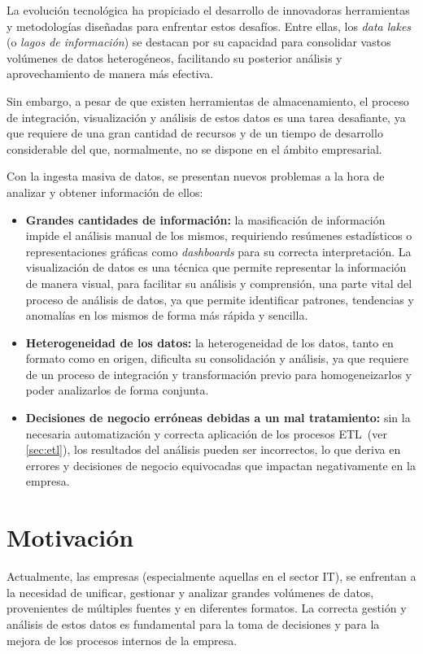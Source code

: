 La evolución tecnológica ha propiciado el desarrollo de innovadoras herramientas
y metodologías diseñadas para enfrentar estos desafíos. Entre ellas, los
\textit{data lakes} (o \emph{lagos de información}) se destacan por su capacidad
para consolidar vastos volúmenes de datos heterogéneos, facilitando su posterior
análisis y aprovechamiento de manera más efectiva.

Sin embargo, a pesar de que existen herramientas de almacenamiento, el proceso
de integración, visualización y análisis de estos datos es una tarea desafiante,
ya que requiere de una gran cantidad de recursos y de un tiempo de desarrollo
considerable del que, normalmente, no se dispone en el ámbito empresarial.

Con la ingesta masiva de datos, se presentan nuevos problemas a la hora de
analizar y obtener información de ellos:

\begin{itemize}
	\item \textbf{Grandes cantidades de información:}
		la masificación de información impide el análisis manual de los
		mismos, requiriendo resúmenes estadísticos o representaciones gráficas
		como \textit{dashboards} para su correcta interpretación.
		La visualización de datos es una técnica que permite representar la
		información de manera visual, para facilitar su análisis y comprensión,
		una parte vital del proceso de análisis de datos, ya que permite
		identificar patrones, tendencias y anomalías en los mismos de forma más
		rápida y sencilla.
	\item \textbf{Heterogeneidad de los datos:}
		la heterogeneidad de los datos, tanto en formato como en origen,
		dificulta su consolidación y análisis, ya que requiere de un proceso de
		integración y transformación previo para homogeneizarlos y poder
		analizarlos de forma conjunta.
	\item \textbf{Decisiones de negocio erróneas debidas a un mal tratamiento:}
		sin la necesaria automatización y correcta aplicación de los procesos
		ETL~(ver \ref{sec:etl}), los resultados del análisis pueden ser
		incorrectos, lo que deriva en errores y decisiones de negocio
		equivocadas que impactan negativamente en la empresa.
\end{itemize}

\newpage{}
\section{Motivación}\label{sec:motivacion}
Actualmente, las empresas (especialmente aquellas en el sector IT), se enfrentan
a la necesidad de unificar, gestionar y analizar grandes volúmenes de datos,
provenientes de múltiples fuentes y en diferentes formatos. La correcta gestión
y análisis de estos datos es fundamental para la toma de decisiones y para la
mejora de los procesos internos de la empresa.

